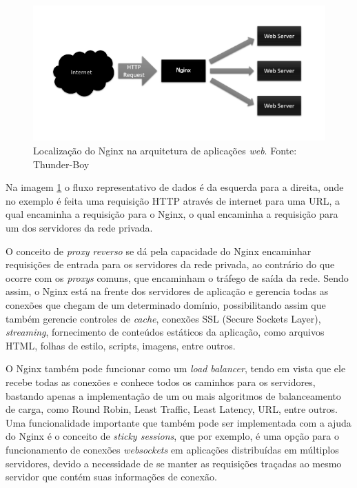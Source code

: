 \begin{figure}[H]
	\centering
	\includegraphics[scale=1]{imagens/nginx.png}
	\caption{\small Localização do Nginx na arquitetura de aplicações \textit{web}. Fonte: Thunder-Boy \cite{img-nginx}}
	\label{fig:nginx}
\end{figure}

Na imagem \ref{fig:nginx} o fluxo representativo de dados é da esquerda para a direita, onde no exemplo é feita uma requisição HTTP através de internet para uma URL, a qual encaminha a requisição para o Nginx, o qual encaminha a requisição para um dos servidores da rede privada.

O conceito de \textit{proxy reverso} se dá pela capacidade do Nginx encaminhar requisições de entrada para os servidores da rede privada, ao contrário do que ocorre com os \textit{proxys} comuns, que encaminham o tráfego de saída da rede. Sendo assim, o Nginx está na frente dos servidores de aplicação e gerencia todas as conexões que chegam de um determinado domínio, possibilitando assim que também gerencie controles de \textit{cache}, conexões SSL (Secure Sockets Layer), \textit{streaming}, fornecimento de conteúdos estáticos da aplicação, como arquivos HTML, folhas de estilo, scripts, imagens, entre outros.

O Nginx também pode funcionar como um \textit{load balancer}, tendo em vista que ele recebe todas as conexões e conhece todos os caminhos para os servidores, bastando apenas a implementação de um ou mais algoritmos de balanceamento de carga, como Round Robin, Least Traffic, Least Latency, URL, entre outros. Uma funcionalidade importante que também pode ser implementada com a ajuda do Nginx é o conceito de \textit{sticky sessions}, que por exemplo, é uma opção para o funcionamento de conexões \textit{websockets} em aplicações distribuídas em múltiplos servidores, devido a necessidade de se manter as requisições traçadas ao mesmo servidor que contém suas informações de conexão.